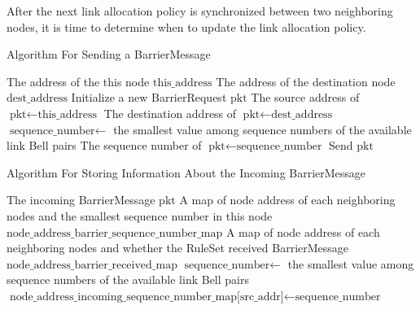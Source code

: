 After the next link allocation policy is synchronized between two neighboring nodes, it is time to determine when to update the link allocation policy.
\begin{algorithm}[H]  
  \begin{minipage}{0.8\linewidth}
  \caption{Algorithm For Sending a BarrierMessage}             
  \begin{algorithmic}[1]
    \Require The address of the this node $\text{this\_address}$      
    \Require The address of the destination node $\text{dest\_address}$    
    \State Initialize a new BarrierRequest $\text{pkt}$
    \State The source address of $\text{pkt} \gets \text{this\_address}$
    \State The destination address of $\text{pkt} \gets \text{dest\_address}$
    \State $\text{sequence\_number} \gets$ the smallest value among sequence numbers of the available link Bell pairs
    \State The sequence number of $\text{pkt} \gets \text{sequence\_number}$
    \State Send $\text{pkt}$
  \end{algorithmic}
\end{minipage}
\end{algorithm}

\begin{algorithm}[H]  
  \begin{minipage}{0.8\linewidth}
  \caption{Algorithm For Storing Information About the Incoming BarrierMessage}                 
  \begin{algorithmic}[1]
  \Require The incoming BarrierMessage $\text{pkt}$
    \Require A map of node address of each neighboring nodes and the smallest sequence number in this node $\text{node\_address\_barrier\_sequence\_number\_map}$
    \Require A map of node address of each neighboring nodes and whether the RuleSet received BarrierMessage $\text{node\_address\_barrier\_received\_map}$
    \State $\text{sequence\_number} \gets$ the smallest value among sequence numbers of the available link Bell pairs
    \State $\text{node\_address\_incoming\_sequence\_number\_map[src\_addr]} \gets \text{sequence\_number}$
  \end{algorithmic}
\end{minipage}
\end{algorithm}

